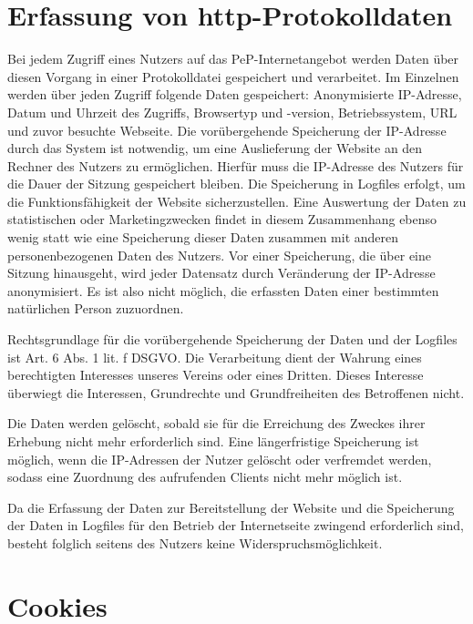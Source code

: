 \documentclass[
  fontsize=12pt,
  paper=a4,
  DIV14,
  parskip,
]{scrartcl}
\begin{document}
\section{Erfassung von http-Protokolldaten}

Bei jedem Zugriff eines Nutzers auf das PeP-Internetangebot werden Daten über
diesen Vorgang in einer Protokolldatei gespeichert und verarbeitet.
Im Einzelnen werden über jeden Zugriff folgende Daten gespeichert:
Anonymisierte IP-Adresse, Datum und Uhrzeit des Zugriffs, Browsertyp und
-version, Betriebssystem, URL und zuvor besuchte Webseite.
Die vorübergehende Speicherung der IP-Adresse durch das System ist notwendig,
um eine Auslieferung der Website an den Rechner des Nutzers zu ermöglichen.
Hierfür muss die IP-Adresse des Nutzers für die Dauer der Sitzung gespeichert
bleiben.
Die Speicherung in Logfiles erfolgt, um die Funktionsfähigkeit der Website
sicherzustellen. Eine Auswertung der Daten zu statistischen oder
Marketingzwecken findet in diesem Zusammenhang ebenso wenig statt wie eine
Speicherung dieser Daten zusammen mit anderen personenbezogenen Daten des
Nutzers. 
Vor einer Speicherung, die über eine Sitzung hinausgeht, wird jeder Datensatz
durch Veränderung der IP-Adresse anonymisiert. Es ist also nicht möglich, die
erfassten Daten einer bestimmten natürlichen Person zuzuordnen.

Rechtsgrundlage für die vorübergehende Speicherung der Daten und der Logfiles
ist Art. 6 Abs. 1 lit. f DSGVO. Die Verarbeitung dient der Wahrung eines
berechtigten Interesses unseres Vereins oder eines Dritten. Dieses Interesse
überwiegt die Interessen, Grundrechte und Grundfreiheiten des Betroffenen
nicht.

Die Daten werden gelöscht, sobald sie für die Erreichung des Zweckes ihrer
Erhebung nicht mehr erforderlich sind. Eine längerfristige Speicherung ist
möglich, wenn die IP-Adressen der Nutzer gelöscht oder verfremdet werden,
sodass eine Zuordnung des aufrufenden Clients nicht mehr möglich ist.

Da die Erfassung der Daten zur Bereitstellung der Website und die Speicherung
der Daten in Logfiles für den Betrieb der Internetseite zwingend erforderlich
sind, besteht folglich seitens des Nutzers keine Widerspruchsmöglichkeit.

\section{Cookies}
\end{document}
